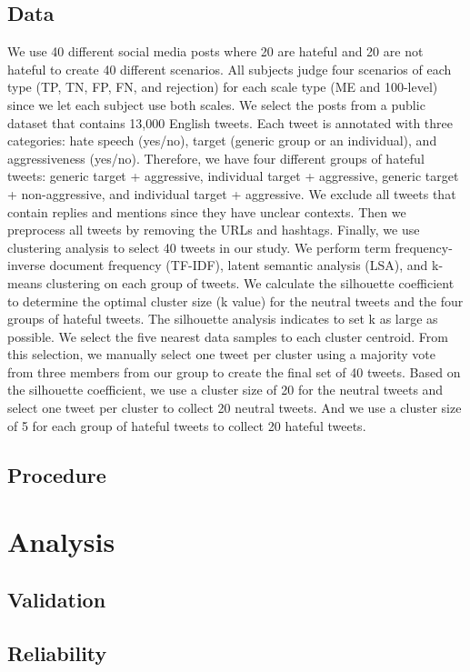 \subsection{Data}
\label{sec:data}
We use 40 different social media posts where 20 are hateful and 20 are not hateful to create 40 different scenarios.
%
All subjects judge four scenarios of each type (TP, TN, FP, FN, and rejection) for each scale type (ME and 100-level) since we let each subject use both scales.
%
We select the posts from a public dataset \citep{basile2019semeval} that contains 13,000 English tweets.
%
Each tweet is annotated with three categories: hate speech (yes/no), target (generic group or an individual), and aggressiveness (yes/no).
%
Therefore, we have four different groups of hateful tweets: generic target + aggressive, individual target + aggressive, generic target + non-aggressive, and individual target + aggressive.
%
We exclude all tweets that contain replies and mentions since  they have unclear contexts.
%
Then we preprocess all tweets by removing the URLs and hashtags.
%
Finally, we use clustering analysis to select 40 tweets in our study.
%
We perform term frequency-inverse document frequency (TF-IDF), latent semantic analysis (LSA), and k-means clustering on each group of tweets.
%
We calculate the silhouette coefficient to determine the optimal cluster size (k value) for the neutral tweets and the four groups of hateful tweets.
%
The silhouette analysis indicates to set k as large as possible.
%
We select the five nearest data samples to each cluster centroid.
%
From this selection, we manually select one tweet per cluster using a majority vote from three members from our group to create the final set of 40 tweets.
%
Based on the silhouette coefficient, we use a cluster size of 20 for the neutral tweets and select one tweet per cluster to collect 20 neutral tweets.
%
And we use a cluster size of 5 for each group of hateful tweets to collect 20 hateful tweets.

\subsection{Procedure}

\section{Analysis}
\label{sec:survey-analysis}

\subsection{Validation}
\subsection{Reliability}


